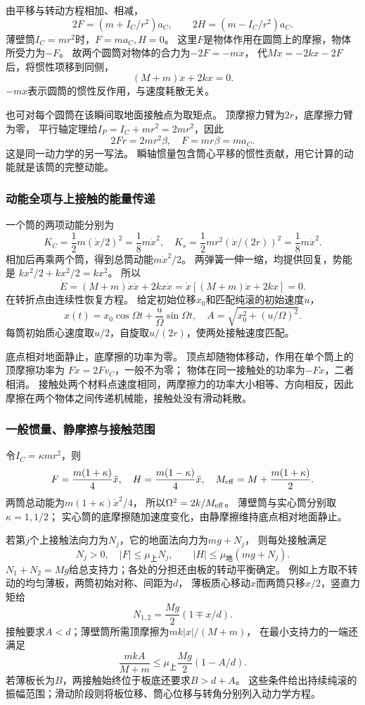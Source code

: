 \documentclass[UTF8,fontset=fandol,a4paper,11pt]{ctexart}
\begin{document}
由平移与转动方程相加、相减，
\[
2F=(m+I_C/r^2)a_C,\qquad
2H=(m-I_C/r^2)a_C.
\]
薄壁筒$I_C=mr^2$时，$F=ma_C,H=0$。
这里$F$是物体作用在圆筒上的摩擦，物体所受力为$-F$。
故两个圆筒对物体的合力为$-2F=-m\ddot x$，
代$M\ddot x=-2kx-2F$后，将惯性项移到同侧，
\[
(M+m)\ddot x+2kx=0.
\]
$-m\ddot x$表示圆筒的惯性反作用，与速度耗散无关。

也可对每个圆筒在该瞬间取地面接触点为取矩点。
顶摩擦力臂为$2r$，底摩擦力臂为零，
平行轴定理给$I_P=I_C+mr^2=2mr^2$，因此
\[
2Fr=2mr^2\beta,\quad F=mr\beta=ma_C.
\]
这是同一动力学的另一写法。
瞬轴惯量包含筒心平移的惯性贡献，用它计算的动能就是该筒的完整动能。

\subsubsection*{动能全项与上接触的能量传递}
一个筒的两项动能分别为
\[
K_{C}=\frac12m(\dot x/2)^2=\frac18m\dot x^2,
\quad K_{s}=\frac12mr^2(\dot x/(2r))^2=\frac18m\dot x^2.
\]
相加后再乘两个筒，得到总筒动能$m\dot x^2/2$。
两弹簧一伸一缩，均提供回复，势能是
$kx^2/2+kx^2/2=kx^2$。
所以
\[
\dot E=(M+m)\dot x\ddot x+2kx\dot x
=\dot x[(M+m)\ddot x+2kx]=0.
\]
在转折点由连续性恢复方程。
给定初始位移$x_0$和匹配纯滚的初始速度$u$，
\[
x(t)=x_0\cos\Omega t+\frac u\Omega\sin\Omega t,
\quad A=\sqrt{x_0^2+(u/\Omega)^2}.
\]
每筒初始质心速度取$u/2$，自旋取$u/(2r)$，使两处接触速度匹配。

底点相对地面静止，底摩擦的功率为零。
顶点却随物体移动，作用在单个筒上的顶摩擦功率为
$F\dot x=2Fv_C$，一般不为零；
物体在同一接触处的功率为$-F\dot x$，二者相消。
接触处两个材料点速度相同，两摩擦力的功率大小相等、方向相反，因此摩擦在两个物体之间传递机械能，接触处没有滑动耗散。

\subsubsection*{一般惯量、静摩擦与接触范围}
令$I_C=\kappa mr^2$，则
\[
F=\frac{m(1+\kappa)}4\ddot x,\quad
H=\frac{m(1-\kappa)}4\ddot x,
\quad M_{\rm eff}=M+\frac{m(1+\kappa)}2.
\]
两筒总动能为$m(1+\kappa)\dot x^2/4$，
所以$\Omega^2=2k/M_{\rm eff}$。
薄壁筒与实心筒分别取$\kappa=1,1/2$；
实心筒的底摩擦随加速度变化，由静摩擦维持底点相对地面静止。

若第$j$个上接触法向力为$N_j$，它的地面法向力为$mg+N_j$，
则每处接触满足
\[
N_j>0,\quad |F|\le\mu_{\text{上}}N_j,
\qquad |H|\le\mu_{\text{地}}(mg+N_j).
\]
$N_1+N_2=Mg$给总支持力；各处的分担还由板的转动平衡确定。
例如上方取不转动的均匀薄板，两筒初始对称、间距为$d$，
薄板质心移动$x$而两筒只移$x/2$，竖直力矩给
\[
N_{1,2}=\frac{Mg}{2}(1\mp x/d).
\]
接触要求$A<d$；薄壁筒所需顶摩擦为$mk|x|/(M+m)$，
在最小支持力的一端还满足
\[
\frac{mkA}{M+m}\le\mu_{\text{上}}\frac{Mg}{2}(1-A/d).
\]
若薄板长为$B$，两接触始终位于板底还要求$B>d+A$。
这些条件给出持续纯滚的振幅范围；滑动阶段则将板位移、筒心位移与转角分别列入动力学方程。
\end{document}

